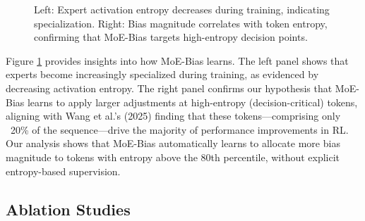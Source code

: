\documentclass{article}
\begin{document}
\begin{figure}[t]
\centering
{}
\caption{Left: Expert activation entropy decreases during training, indicating specialization. Right: Bias magnitude correlates with token entropy, confirming that MoE-Bias targets high-entropy decision points.}
\label{fig:analysis}
\end{figure}

Figure \ref{fig:analysis} provides insights into how MoE-Bias learns. The left panel shows that experts become increasingly specialized during training, as evidenced by decreasing activation entropy. The right panel confirms our hypothesis that MoE-Bias learns to apply larger adjustments at high-entropy (decision-critical) tokens, aligning with Wang et al.'s (2025) finding that these tokens—comprising only ~20\% of the sequence—drive the majority of performance improvements in RL. Our analysis shows that MoE-Bias automatically learns to allocate more bias magnitude to tokens with entropy above the 80th percentile, without explicit entropy-based supervision.

\subsection{Ablation Studies}
\end{document}
